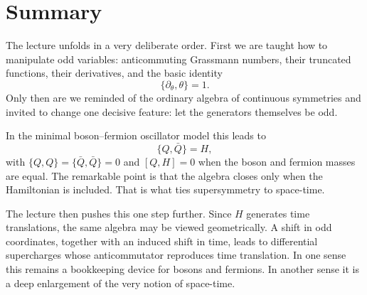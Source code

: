 \section{Summary}

The lecture unfolds in a very deliberate order. First we are taught how to manipulate odd variables: anticommuting Grassmann numbers, their truncated functions, their derivatives, and the basic identity
\begin{equation}
\{\partial_\theta,\theta\}=1.
\end{equation}
Only then are we reminded of the ordinary algebra of continuous symmetries and invited to change one decisive feature: let the generators themselves be odd.

In the minimal boson--fermion oscillator model this leads to
\begin{equation}
\{Q,\bar Q\}=H,
\end{equation}
with \(\{Q,Q\}=\{\bar Q,\bar Q\}=0\) and \([Q,H]=0\) when the boson and fermion masses are equal. The remarkable point is that the algebra closes only when the Hamiltonian is included. That is what ties supersymmetry to space-time.

The lecture then pushes this one step further. Since \(H\) generates time translations, the same algebra may be viewed geometrically. A shift in odd coordinates, together with an induced shift in time, leads to differential supercharges whose anticommutator reproduces time translation. In one sense this remains a bookkeeping device for bosons and fermions. In another sense it is a deep enlargement of the very notion of space-time.